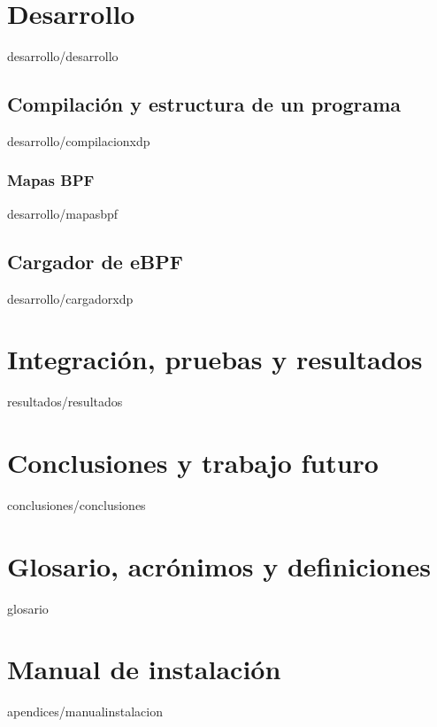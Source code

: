 \documentclass[epsbased,copyright,final,printable,covers,extendedindex,firstnumbered,tfg,gnuplot]{tfgtfmthesisuam}
\begin{document}
    
    
    
\chapter{Desarrollo\label{CAP:DESARROLLO}}{desarrollo/desarrollo}
    \section{Compilación y estructura de un programa\label{SEC:COMPILACIONXDP}}{desarrollo/compilacionxdp}
        \subsection{Mapas BPF\label{SEC:MAPASBPF}}{desarrollo/mapasbpf}
    \section{Cargador de eBPF\label{SEC:CARGADORXDP}}{desarrollo/cargadorxdp}
    
    


\chapter{Integración, pruebas y resultados\label{CAP:RESULTADOS}}{resultados/resultados}


\chapter{Conclusiones y trabajo futuro\label{CAP:CONCLUSIONES}}{conclusiones/conclusiones}



\newpage
{}



\chapter[Glosario, acrónimos y definiciones]{Glosario, acrónimos y definiciones\label{SEC:GLOSARIO}}{glosario}

\appendix
\chapter{Manual de instalación\label{CAP:INSTALACION}}{apendices/manualinstalacion}
\end{document}
